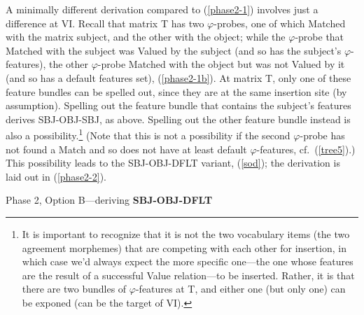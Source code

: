 \documentclass[output=paper
,modfonts
,nonflat]{langsci/langscibook}
\begin{document}
A minimally different derivation compared to (\ref{phase2-1}) involves just a difference at VI. Recall that matrix T has two $\varphi$-probes, one of which Matched with the matrix subject, and the other with the object; while the $\varphi$-probe that Matched with the subject was Valued by the subject (and so has the subject's $\varphi$-features), the other $\varphi$-probe Matched with the object but was not Valued by it (and so has a default features set), (\ref{phase2-1b}).  At matrix T, only one of these feature bundles can be spelled out, since they are at the same insertion site (by assumption). Spelling out the feature bundle that contains the subject's features derives SBJ-OBJ-SBJ, as above. Spelling out the other feature bundle instead is also a possibility.\footnote{It is important to recognize that it is not the two vocabulary items (the two agreement morphemes) that are competing with each other for insertion, in which case we'd always expect the more specific one---the one whose features are the result of a successful Value relation---to be inserted. Rather, it is that there are two bundles of $\varphi$-features at T, and either one (but only one) can be exponed (can be the target of VI).} (Note that this is not a possibility if the second $\varphi$-probe has not found a Match and so does not have at least default $\varphi$-features, cf.\ (\ref{tree5}).) This possibility leads to the SBJ-OBJ-DFLT variant, (\ref{sod}); the derivation is laid out in (\ref{phase2-2}).

\begin{exe}
\ex Phase 2, Option B---deriving \textbf{SBJ-OBJ-DFLT} \label{phase2-2}
\begin{xlist}
\end{xlist}
\end{exe}
\end{document}
